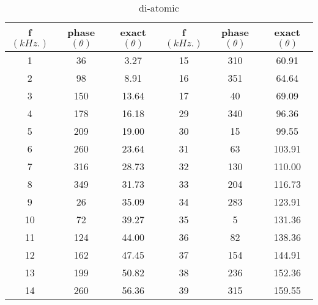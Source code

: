 \begin{table}[h]
	\centering
	\caption{di-atomic}
	\label{tabal}
	\begin{tabular}{|c|c|c||c|c|c|}
f$(kHz.)$  & phase$(\theta)$& exact$(\theta)$ &f$(kHz.)$  & phase$(\theta)$& exact$(\theta)$ \\ \hline
1  & 36  & 3.27  & 15 & 310 & 60.91  \\
2  & 98  & 8.91  & 16 & 351 & 64.64  \\
3  & 150 & 13.64 & 17 & 40  & 69.09  \\
4  & 178 & 16.18 & 29 & 340 & 96.36  \\
5  & 209 & 19.00 & 30 & 15  & 99.55  \\
6  & 260 & 23.64 & 31 & 63  & 103.91 \\
7  & 316 & 28.73 & 32 & 130 & 110.00 \\
8  & 349 & 31.73 & 33 & 204 & 116.73 \\
9  & 26  & 35.09 & 34 & 283 & 123.91 \\
10 & 72  & 39.27 & 35 & 5   & 131.36 \\
11 & 124 & 44.00 & 36 & 82  & 138.36 \\
12 & 162 & 47.45 & 37 & 154 & 144.91 \\
13 & 199 & 50.82 & 38 & 236 & 152.36 \\
14 & 260 & 56.36 & 39 & 315 & 159.55 \\
	\end{tabular}
\end{table}